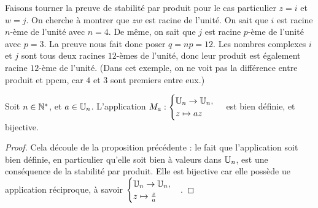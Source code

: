 \begin{remarque}
Faisons \og tourner\fg{} la preuve de stabilité par produit pour le cas particulier $z=i$ et $w=j$. On cherche à montrer que $zw$ est racine de l'unité. On sait que $i$ est racine $n$-ème de l'unité avec $n=4$. De même, on sait que $j$ est racine $p$-ème de l'unité avec $p=3$. La preuve nous fait donc poser $q=np=12$. Les nombres complexes $i$ et $j$ sont tous deux racines $12$-èmes de l'unité, donc leur produit est également racine $12$-ème de l'unité. (Dans cet exemple, on ne voit pas la différence entre produit et ppcm, car $4$ et $3$ sont premiers entre eux.)
\end{remarque}


\begin{proposition}
Soit $n\in\mathbb{N}^*$, et $a\in\mathbb{U}_n$. L'application $M_a : \begin{cases} \mathbb{U}_n\to \mathbb{U}_n,\\z\mapsto az\end{cases}$ est bien définie, et bijective.
\end{proposition}
\begin{proof}
Cela découle de la proposition précédente : le fait que l'application soit bien définie, en particulier qu'elle soit bien à valeurs dans $\mathbb{U}_n$, est une conséquence de la stabilité par produit. Elle est bijective car elle possède ue application réciproque, à savoir $\begin{cases} \mathbb{U}_n\to \mathbb{U}_n,\\z\mapsto \frac{z}{a}\end{cases}$.
\end{proof}

